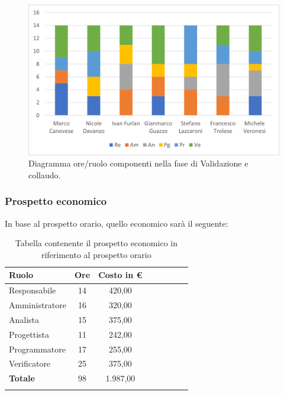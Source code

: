\begin{figure}[H]
	\centering
	\includegraphics[width=0.8\linewidth]{res/images/preventivo/7-1.png}
	\caption{Diagramma ore/ruolo componenti nella fase di Validazione e collaudo.}
	\label{fig:diagramma suddivisione ruoli fase Validazione e collaudo.}
\end{figure}

\subsubsection{Prospetto economico}
In base al prospetto orario, quello economico sarà il seguente:

\begin{longtable}{|l|c|c|c|c|c|c|c|}
	\hline
	\rowcolor{lighter-grayer}
	\textbf{Ruolo}  & \textbf{Ore} & \textbf{Costo in €} \\
	\hline
	\endfirsthead

	\hline
	Responsabile    & 14           & 420,00              \\
	\hline
	\hline
	Amministratore  & 16           & 320,00              \\
	\hline
	\hline
	Analista        & 15           & 375,00              \\
	\hline
	\hline
	Progettista     & 11           & 242,00              \\
	\hline
	\hline
	Programmatore   & 17           & 255,00              \\
	\hline
	\hline
	Verificatore    & 25           & 375,00              \\
	\hline
	\hline
	\textbf{Totale} & 98           & 1.987,00            \\
	\hline
	\rowcolor{white}
	\caption{Tabella contenente il prospetto economico in riferimento al prospetto orario}
\end{longtable}
\pagebreak

